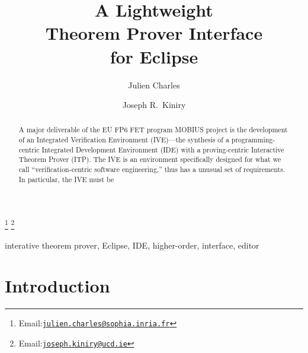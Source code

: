 \documentclass{entcs}
\begin{document}
\begin{frontmatter}

\title{A Lightweight\\Theorem Prover Interface\\for Eclipse}

\author{Julien Charles}

\address{Everest Group\\
  INRIA Sophia Antipolis\\
  2004 Route des Lucioles - BP 93\\
  FR-06902 Sophia Antipolis, France}

\author{Joseph R.~Kiniry}

\address{Systems Research Group\\
  School of Computer Science and Informatics\\
  University College Dublin\\
  Belfield, Dublin 4, Ireland}

\thanks[charles]{Email:\href{mailto:julien.charles@sophia.inria.fr}
  {\texttt{\normalshape julien.charles@sophia.inria.fr}}}
\thanks[kiniry]{Email:\href{mailto:joseph.kiniry@ucd.ie}
  {\texttt{\normalshape joseph.kiniry@ucd.ie}}}

\thispagestyle{empty}
\begin{abstract}

  A major deliverable of the EU FP6 FET program MOBIUS project is the
  development of an Integrated Verification Environment (IVE)---the
  synthesis of a programming-centric Integrated Development
  Environment (IDE) with a proving-centric Interactive Theorem Prover
  (ITP).  The IVE is an environment specifically designed for what we
  call ``verification-centric software engineering,'' thus has a
  unusual set of requirements.  In particular, the IVE must be 

\end{abstract}
\begin{keyword}
 interative theorem prover, Eclipse, IDE, higher-order, interface, editor
\end{keyword}

\end{frontmatter}

\section{Introduction}
\label{sec:introduction}
\end{document}

